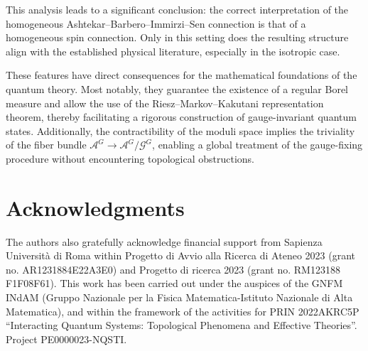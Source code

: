 \documentclass{article}
\numberwithin{equation}{section}
\theoremstyle{definition}
\newcommand{\A}{\mathcal{A}}
\begin{document}
\medskip

This analysis leads to a significant conclusion: the correct interpretation of the homogeneous Ashtekar–Barbero–Immirzi–Sen connection is that of a homogeneous spin connection. Only in this setting does the resulting structure align with the established physical literature, especially in the isotropic case.

These features have direct consequences for the mathematical foundations of the quantum theory. Most notably, they guarantee the existence of a regular Borel measure and allow the use of the Riesz–Markov–Kakutani representation theorem, thereby facilitating a rigorous construction of gauge-invariant quantum states. Additionally, the contractibility of the moduli space implies the triviality of the fiber bundle $\mathcal{\A}^G \to \A^G/\mathcal{G}^G$, enabling a global treatment of the gauge-fixing procedure without encountering topological obstructions.

\section*{Acknowledgments}
The authors also gratefully acknowledge financial support from Sapienza Università di Roma within Progetto di Avvio alla Ricerca di Ateneo 2023 (grant no. AR1231884E22A3E0) and Progetto di ricerca 2023 (grant no. RM123188 F1F08F61). This work has been carried out under the auspices of the GNFM INdAM (Gruppo Nazionale per la Fisica Matematica-Istituto Nazionale di Alta Matematica), and within the framework of the activities for PRIN 2022AKRC5P “Interacting Quantum Systems: Topological Phenomena and Effective Theories”. Project PE0000023-NQSTI.

 

\end{document}
